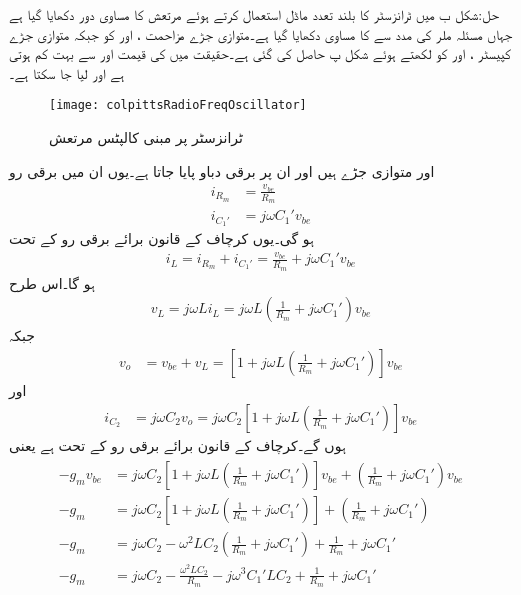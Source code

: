 حل:شکل  ب میں ٹرانزسٹر کا بلند تعدد ماڈل استعمال کرتے ہوئے مرتعش کا مساوی دور دکھایا گیا ہے جہاں مسئلہ ملر کی مدد سے  کا مساوی  دکھایا گیا ہے۔متوازی جڑے مزاحمت ،  اور  کو  جبکہ متوازی جڑے کپیسٹر ،  اور  کو  لکھتے ہوئے شکل  پ حاصل کی گئی ہے۔حقیقت میں  کی قیمت اور  سے بہت کم ہوتی ہے اور  لیا جا سکتا ہے۔  
\begin{figure}
\centering
\texttt{[image: colpittsRadioFreqOscillator]}
\caption{ٹرانزسٹر پر مبنی کالپٹس مرتعش}
\label{شکل_مرتعش_کالپٹس}
\end{figure}
 اور  متوازی جڑے ہیں اور ان پر برقی دباو  پایا جاتا ہے۔یوں ان میں برقی رو
\begin{align*}
i_{R_m}&=\frac{v_{be}}{R_m}\\
i_{C_1'}&=j \omega C_1' v_{be}
\end{align*}
ہو گی۔یوں کرچاف کے قانون برائے برقی رو کے تحت
\begin{align*}
i_L=i_{R_m}+i_{C_1'}=\frac{v_{be}}{R_m}+j \omega C_1' v_{be}
\end{align*}
ہو گا۔اس طرح
\begin{align*}
v_L=j \omega L i_L=j \omega L \left(\frac{1}{R_m}+j \omega C_1' \right) v_{be}
\end{align*}
جبکہ
\begin{align*}
v_o&=v_{be}+v_L=\left[1+ j \omega L \left(\frac{1}{R_m}+j \omega C_1' \right) \right] v_{be}
\end{align*}
اور
\begin{align*}
i_{C_2}&=j \omega C_2 v_o=j \omega C_2 \left[1+ j \omega L \left(\frac{1}{R_m}+j \omega C_1' \right) \right] v_{be}
\end{align*}
ہوں گے۔کرچاف کے قانون برائے برقی رو کے تحت  ہے یعنی
\begin{gather}
\begin{aligned} \label{مساوات_مرتعش_ٹرانزسٹر_کالپٹس_مثال_الف}
-g_m v_{be}&=j \omega C_2 \left[1+ j \omega L \left(\frac{1}{R_m}+j \omega C_1' \right) \right] v_{be}+\left(\frac{1}{R_m}+j \omega C_1'\right) v_{be}\\
-g_m&=j \omega C_2 \left[1+ j \omega L \left(\frac{1}{R_m}+j \omega C_1' \right) \right] +\left(\frac{1}{R_m}+j \omega C_1'\right)\\
-g_m&=j \omega C_2 - \omega^2 L C_2 \left(\frac{1}{R_m}+j \omega C_1' \right)  +\frac{1}{R_m}+j \omega C_1'\\
-g_m&=j \omega C_2 -\frac{ \omega^2 L C_2 }{R_m}-j \omega^3 C_1' L C_2  +\frac{1}{R_m}+j \omega C_1'
\end{aligned}
\end{gather}
